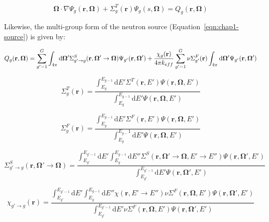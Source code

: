 \begin{equation}
\label{eqn:chap2-transport-eqn-mg}
\mathbf{\Omega} \cdot \nabla \Psi_g(\mathbf{r},\mathbf{\mathbf{\Omega}}) + \Sigma^T_{g}(\mathbf{r})\Psi_g(s,\mathbf{\Omega}) = Q_g(\mathbf{r},\mathbf{\Omega})
\end{equation}

Likewise, the multi-group form of the neutron source (Equation~\ref{eqn:chap1-source}) is given by:

\begin{dmath}
\label{eqn:chap2-source-mg}
Q_g(\mathbf{r},\mathbf{\Omega}) = \displaystyle\sum\limits_{g'=1}^G \int_{4\pi} \mathrm{d}\mathbf{\Omega'}\Sigma_{g'\rightarrow g}^S(\mathbf{r},{\mathbf{\Omega'}\rightarrow\mathbf{\Omega}}) \Psi_{g'}(\mathbf{r},\mathbf{\Omega'}) + \\ \frac{\chi_{g}(\mathbf{r})}{4\pi k_{eff}} \displaystyle\sum\limits_{g'=1}^G \nu\Sigma_{g'}^F(\mathbf{r}) \int_{4\pi} \mathrm{d}\mathbf{\Omega'} \Psi_{g'}(\mathbf{r},\mathbf{\Omega'})
\end{dmath}

\begin{equation}
\label{eqn:moc-theory-condensed-total-xs}
\Sigma_{g}^T(\mathbf{r}) = \frac{\int_{E_{g}}^{E_{g-1}}\mathrm{d}E'\Sigma^T(\mathbf{r},E')\Psi(\mathbf{r},\mathbf{\Omega},E')}{\int_{E_{g}}^{E_{g-1}}\mathrm{d}E'\Psi(\mathbf{r},\mathbf{\Omega},E')}
\end{equation}

\begin{equation}
\label{eqn:moc-theory-condensed-fission-xs}
\Sigma_{g}^F(\mathbf{r}) = \frac{\int_{E_{g}}^{E_{g-1}}\mathrm{d}E'\Sigma^F(\mathbf{r},E')\Psi(\mathbf{r},\mathbf{\Omega},E')}{\int_{E_{g}}^{E_{g-}1}\mathrm{d}E'\Psi(\mathbf{r},\mathbf{\Omega},E')}
\end{equation}

\begin{equation}
\label{eqn:moc-theory-condensed-scatter-xs}
\Sigma_{g'\rightarrow g}^S(\mathbf{r},\mathbf{\Omega'}\rightarrow \mathbf{\Omega}) = \frac{\int_{E_{g'}}^{E_{g'-1}}\mathrm{d}E'\int_{E_{g}}^{E_{g-1}}\mathrm{d}E''\Sigma^S(\mathbf{r},\mathbf{\Omega'}\rightarrow \mathbf{\Omega},E'\rightarrow E'')\Psi(\mathbf{r},\mathbf{\Omega'},E')}{\int_{E_{g'}}^{E_{g'-1}}\mathrm{d}E'\Psi(\mathbf{r},\mathbf{\Omega'},E')}
\end{equation}

\begin{equation}
\label{eqn:moc-theory-condensed-chi}
\chi_{g'\rightarrow g}(\mathbf{r}) = \frac{\int_{E_{g'}}^{E_{g'-1}}\mathrm{d}E'\int_{E_{g}}^{E_{g-1}}\mathrm{d}E''\chi(\mathbf{r},E'\rightarrow E'')\nu\Sigma^F(\mathbf{r},\mathbf{\Omega},E')\Psi(\mathbf{r},\mathbf{\Omega'},E')}{\int_{E_{g'}}^{E_{g'-1}}\mathrm{d}E'\nu\Sigma^F(\mathbf{r},\mathbf{\Omega},E')\Psi(\mathbf{r},\mathbf{\Omega'},E')}
\end{equation}

